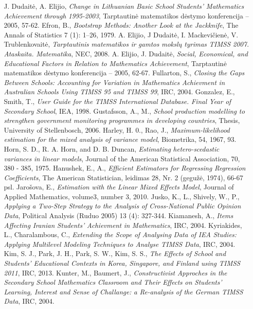 \documentclass[12pt,a4paper]{article}
\begin{document}
\begin{thebibliography}{1}
 J. Dudaitė, A. Elijio, \textit{Change in Lithuanian Basic School Students’ Mathematics Achievement through 1995-2003}, Tarptautinė matematikos dėstymo konferencija – 2005, 57-62.
 Efron, B., \textit{Bootstrap Methods: Another Look at the Jackknife}, The Annals of Statistics 7 (1): 1–26, 1979.
 A. Elijio, J Dudaitė, I. Mackevičienė, V. Trublenkovaitė, \textit{Tarptautinis matematikos ir gamtos mokslų tyrimas TIMSS 2007. Ataskaita. Matematika}, NEC, 2008.
 A. Elijio, J. Dudaitė, \textit{Social, Economical, and Educational Factors in Relation to Mathematics Achievement}, Tarptautinė matematikos dėstymo konferencija – 2005, 62-67.
 Fullarton, S., \textit{Closing the Gaps Between Schools: Accounting for Variation in Mathematics Achievment in Australian Schools Using TIMSS 95 and TIMSS 99}, IRC, 2004.
 Gonzalez, E., Smith, T., \textit{User Guide for the TIMSS International Database. Final Year of Secondary School}, IEA, 1998.
 Gustafsson, A., M., \textit{School production modelling to strengthen government monitoring programmes in developing countries}, Thesis, University of Stellenbosch, 2006.
 Harley, H. 0., Rao, J., \textit{Maximum-likelihood estimation for the mixed analysis of variance model}, Biometrika, 54, 1967, 93.
 Horn, S. D., R. A. Horn, and D. B. Duncan, \textit{Estimating hetero-scedastic variances in linear models}, Journal of the American Statistical Association, 70, 380 - 385, 1975.
 Hanushek, E., A., \textit{Efficient Estimators for Regressing Regression Coefficients}, The American Statistician, leidimas 28, Nr. 2 (gegužė, 1974), 66-67 psl.
 Jarošova, E., \textit{Estimation with the Linear Mixed Effects Model}, Journal of Applied Mathematics, volume3, number 3, 2010.
 Jusko, K., L., Shively, W., P., \textit{Applying a Two-Step Strategy to the Analysis of Cross-National Public Opinion Data}, Political Analysis (Ruduo 2005) 13 (4): 327-344. 
 Kiamanesh, A., \textit{Items Affecting Iranian Students' Achievment in Mathematics}, IRC, 2004.
 Kyriakides, L., Charalambous, C., \textit{ Extending the Scope of Analysing Data of IEA Studies: Applying Multilevel Modeling Techniques to Analyse TIMSS Data}, IRC, 2004.
 Kim, S. J., Park, J. H., Park, S. W., Kim, S. S., \textit{The Effects of School and Students’ Educational Contexts in Korea, Singapore, and Finland using TIMSS 2011}, IRC, 2013.
 Kunter, M., Baumert, J., \textit{Constructivist Approches in the Secondary School Mathematics Classroom and Their Effects on Students' Learning, Interest and Sense of Challange: a Re-analysis of the German TIMSS Data}, IRC, 2004.

\end{thebibliography}
\end{document}

